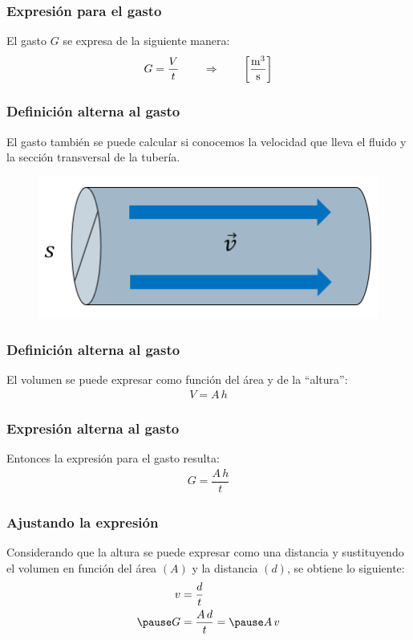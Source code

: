 \documentclass[14pt]{beamer}
\begin{document}
\begin{frame}
\frametitle{Expresión para el gasto}
El gasto $G$ se expresa de la siguiente manera:
\pause
\begin{align*}
G = \dfrac{V}{t} \hspace{0.75cm} \Rightarrow \hspace{0.75cm} \left[ \unit[per-mode=fraction]{\cubic\meter\per\second} \right]
\end{align*}
\end{frame}
\begin{frame}
\frametitle{Definición alterna al gasto}
El gasto también se puede calcular si conocemos la velocidad que lleva el fluido y la sección transversal de la tubería.
\begin{figure}
    \centering
    \includegraphics[scale=0.65]{Imagenes/Gasto_02.png}
\end{figure}
\end{frame}
\begin{frame}
\frametitle{Definición alterna al gasto}
El volumen se puede expresar como función del área y de la \enquote{altura}:
\pause
\begin{align*}
V = A \, h
\end{align*}
\end{frame}
\begin{frame}
\frametitle{Expresión alterna al gasto}
Entonces la expresión para el gasto resulta:
\pause
\begin{align*}
G = \dfrac{A \, h}{t}
\end{align*}
\end{frame}
\begin{frame}
\frametitle{Ajustando la expresión}
Considerando que la altura se puede expresar como una distancia \pause y sustituyendo el volumen en función del área $(A)$ y la distancia $(d)$, se obtiene lo siguiente:
\begin{eqnarray*}
\begin{aligned}
v &= \dfrac{d}{t} \\ \pause 
G &= \dfrac{A \, d}{t} = \pause A \, v
\end{aligned}
\end{eqnarray*}
\end{frame}
\end{document}
